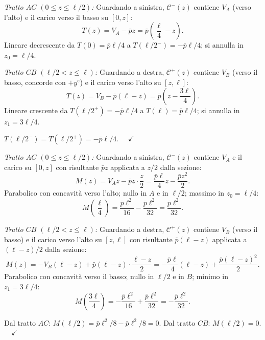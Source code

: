 \begin{esempio}
\begin{svolgimento}
		
		\textit{Tratto $AC$ $(0 \leq z \leq \ell/2)$:}
		Guardando a sinistra, $\mathcal{C}^-(z)$ contiene
		$V_A$ (verso l'alto) e il carico verso il basso
		su $[0,z]$:
		\[
		T(z) = V_A - \bar{p}z
		= \bar{p}\!\left(\frac{\ell}{4} - z\right).
		\]
		Lineare decrescente da $T(0) = \bar{p}\ell/4$
		a $T(\ell/2^-) = -\bar{p}\ell/4$; si annulla in
		$z_0 = \ell/4$.
		
		\textit{Tratto $CB$ $(\ell/2 < z \leq \ell)$:}
		Guardando a destra, $\mathcal{C}^+(z)$ contiene
		$V_B$ (verso il basso, concorde con $+y^e$) e il
		carico verso l'alto su $[z,\ell]$:
		\[
		T(z) = V_B - \bar{p}(\ell - z)
		= \bar{p}\!\left(z - \frac{3\ell}{4}\right).
		\]
		Lineare crescente da $T(\ell/2^+) = -\bar{p}\ell/4$
		a $T(\ell) = \bar{p}\ell/4$; si annulla in
		$z_1 = 3\ell/4$.
		
		$T(\ell/2^-) = T(\ell/2^+) = -\bar{p}\ell/4$.
		$\quad\checkmark$
		
		
		\textit{Tratto $AC$ $(0 \leq z \leq \ell/2)$:}
		Guardando a sinistra, $\mathcal{C}^-(z)$ contiene
		$V_A$ e il carico su $[0,z]$ con risultante
		$\bar{p}z$ applicata a $z/2$ dalla sezione:
		\[
		M(z) = V_A z - \bar{p}z\cdot\frac{z}{2}
		= \frac{\bar{p}\ell}{4}z - \frac{\bar{p}z^2}{2}.
		\]
		Parabolico con concavità verso l'alto; nullo in
		$A$ e in $\ell/2$; massimo in $z_0 = \ell/4$:
		\[
		M\!\left(\frac{\ell}{4}\right)
		= \frac{\bar{p}\ell^2}{16} - \frac{\bar{p}\ell^2}{32}
		= \frac{\bar{p}\ell^2}{32}.
		\]
		
		\textit{Tratto $CB$ $(\ell/2 < z \leq \ell)$:}
		Guardando a destra, $\mathcal{C}^+(z)$ contiene
		$V_B$ (verso il basso) e il carico verso l'alto
		su $[z,\ell]$ con risultante $\bar{p}(\ell-z)$
		applicata a $(\ell-z)/2$ dalla sezione:
		\[
		M(z) = -V_B(\ell-z) + \bar{p}(\ell-z)\cdot
		\frac{\ell-z}{2}
		= -\frac{\bar{p}\ell}{4}(\ell-z)
		+ \frac{\bar{p}(\ell-z)^2}{2}.
		\]
		Parabolico con concavità verso il basso; nullo
		in $\ell/2$ e in $B$; minimo in $z_1 = 3\ell/4$:
		\[
		M\!\left(\frac{3\ell}{4}\right)
		= -\frac{\bar{p}\ell^2}{16}
		+ \frac{\bar{p}\ell^2}{32}
		= -\frac{\bar{p}\ell^2}{32}.
		\]
		
		Dal tratto $AC$: $M(\ell/2) = \bar{p}\ell^2/8
		- \bar{p}\ell^2/8 = 0$.
		Dal tratto $CB$: $M(\ell/2) = 0$.
		$\quad\checkmark$
		

\end{svolgimento}
\end{esempio}
